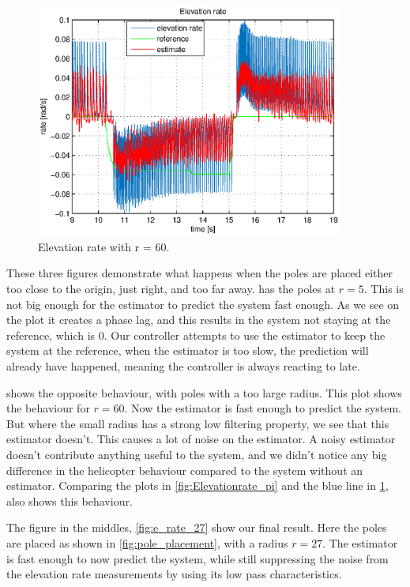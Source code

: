 \begin{figure}[H]
\begin{minipage}{.5\textwidth}
		\includegraphics[width=0.9\textwidth]{plots/part4new/P/elevation_rate_60.eps}
	    \caption{Elevation rate with r = 60.}
        \label{fig:e_rate_60}
    \end{minipage}
\end{figure}

These three figures demonstrate what happens when the poles are placed either too close to the origin, just right, and too far away.  has the poles at $r=5$. This is not big enough for the estimator to predict the system fast enough. As we see on the plot it creates a phase lag, and this results in the system not staying at the reference, which is $0$. Our controller attempts to use the estimator to keep the system at the reference, when the estimator is too slow, the prediction will already have happened, meaning the controller is always reacting to late.\medskip

 shows the opposite behaviour, with poles with a too large radius. This plot shows the behaviour for $r=60$. Now the estimator is fast enough to predict the system. But where the small radius has a strong low filtering property, we see that this estimator doesn't. This causes a lot of noise on the estimator. A noisy estimator doesn't contribute anything useful to the system, and we didn't notice any big difference in the helicopter behaviour compared to the system without an estimator. Comparing the plots in \cref{fig:Elevationrate_pi} and the blue line in \cref{fig:e_rate_60}, also shows this behaviour.\medskip

The figure in the middles, \cref{fig:e_rate_27} show our final result. Here the poles are placed as shown in \cref{fig:pole_placement}, with a radius $r=27$. The estimator is fast enough to now predict the system, while still suppressing the noise from the elevation rate measurements by using its low pass characteristics.\medskip

